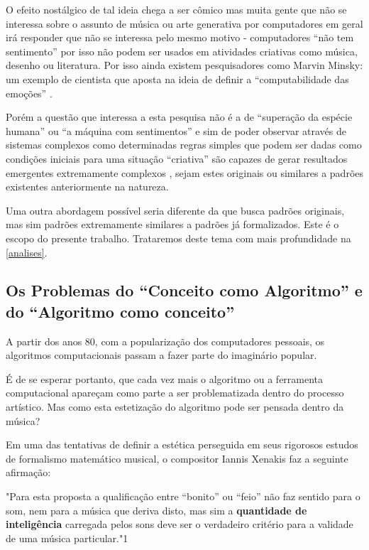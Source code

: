 \documentclass[
	12pt,				%
	openright,			%
	twoside,			%
	a4paper,			%
	english,			%
	french,				%
	spanish,			%
	brazil				%
	]{abntex2}
\begin{document}
O efeito nostálgico de tal ideia chega a ser cômico mas muita gente que não se interessa sobre o assunto de música ou arte generativa por computadores em geral irá responder que não se interessa pelo mesmo motivo - computadores “não tem sentimento” por isso não podem ser usados em atividades criativas como música, desenho ou literatura. Por isso ainda existem pesquisadores como Marvin Minsky: um exemplo de cientista que aposta na ideia de definir a “computabilidade das emoções” \cite{minsky2007emotion}. 

Porém a questão que interessa a esta pesquisa não é a de “superação da espécie humana” ou “a máquina com sentimentos” e sim de poder observar através de sistemas complexos como determinadas regras simples que podem ser dadas como condições iniciais para uma situação “criativa” são capazes de gerar resultados emergentes extremamente complexos \cite{wolfram2002new}, sejam estes originais ou similares a padrões existentes anteriormente na natureza. 

Uma outra abordagem possível seria diferente da que busca padrões originais, mas sim padrões extremamente similares a padrões já formalizados. Este é o escopo do presente trabalho. Trataremos deste tema com mais profundidade na \autoref{analises}.


\subsection{Os Problemas do “Conceito como Algoritmo” e do “Algoritmo como conceito”}

A partir dos anos 80, com a popularização dos computadores pessoais, os algoritmos computacionais passam a fazer parte do imaginário popular.

É de se esperar portanto, que cada vez mais o algoritmo ou a ferramenta computacional apareçam como parte a ser problematizada dentro do processo artístico. Mas como esta estetização do algoritmo pode ser pensada dentro da música?

Em uma das tentativas de definir a estética perseguida em seus rigorosos estudos de formalismo matemático musical, o compositor Iannis Xenakis faz a seguinte afirmação: 

\begin{citacao}
"Para esta proposta a qualificação entre “bonito” ou “feio” não faz sentido para o som, nem para a música que deriva disto, mas sim a \textbf{quantidade de inteligência} carregada pelos sons deve ser o verdadeiro critério para a validade de uma música particular."1 \cite[ p.4, grifos nossos.]{xenakis1992formalized} 
\end{citacao}
\end{document}
